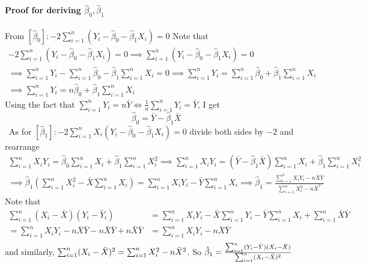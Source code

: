 \begin{mdframed}[backgroundcolor=blue!5] 
\textbf{Proof for deriving $\hat{\beta}_0,\hat{\beta}_1$}
\\ \\
\footnotesize{From $[\hat{\beta}_0]: -2\sum_{i=1}^n(Y_i-\hat{\beta}_0-\hat{\beta}_1X_i)=0$ Note that 
\begin{gather*}
-2\sum_{i=1}^n(Y_i-\hat{\beta}_0-\hat{\beta}_1X_i)=0 \implies \sum_{i=1}^n(Y_i-\hat{\beta}_0-\hat{\beta}_1X_i)=0 \\
\implies  \sum_{i=1}^n Y_i -\sum_{i=1}^n\hat{\beta}_0 -\hat{\beta}_1\sum_{i=1}^nX_i =0 \implies  \sum_{i=1}^n Y_i =\sum_{i=1}^n\hat{\beta}_0 +\hat{\beta}_1\sum_{i=1}^nX_i \\
\implies  \sum_{i=1}^n Y_i =n\hat{\beta}_0 +\hat{\beta}_1\sum_{i=1}^nX_i
\end{gather*}
Using the fact that $\sum_{i=1}^n Y_i = n\bar{Y} \iff \frac{1}{n}\sum_{i=1}^n Y_i = \bar{Y}$, I get
\[
\hat{\beta}_0=\bar{Y}-\hat{\beta}_1\bar{X}
\]\
As for $[\hat{\beta}_1]: -2\sum_{i=1}^nX_i(Y_i-\hat{\beta}_0-\hat{\beta}_1X_i)=0$ divide both sides by $-2$ and rearrange
\begin{gather*}
\sum_{i=1}^nX_iY_i=\hat{\beta}_0\sum_{i=1}^nX_i +\hat{\beta}_1\sum_{i=1}^nX_i^2\implies \sum_{i=1}^nX_iY_i=(\bar{Y}-\hat{\beta}_1\bar{X})\sum_{i=1}^nX_i +\hat{\beta}_1\sum_{i=1}^nX_i^2\\
\implies\hat{\beta}_1\left(\sum_{i=1}^nX_i^2-\bar{X}\sum_{i=1}^nX_i\right)=\sum_{i=1}^nX_iY_i-\bar{Y}\sum_{i=1}^nX_i
\implies \hat{\beta}_1 = \frac{\sum_{i=1}^nX_iY_i - n\bar{X}\bar{Y}}{\sum_{i=1}^nX_i^2-n{\bar{X}}^2}
\end{gather*}
Note that 
\[
\begin{aligned}
\sum_{i=1}^n(X_i-\bar{X})(Y_i-\bar{Y}_i) &= \sum_{i=1}^nX_iY_i - \bar{X}\sum_{i=1}^nY_i -\bar{Y}\sum_{i=1}^nX_i +\sum_{i=1}^n\bar{X}\bar{Y} \\
=\sum_{i=1}^nX_iY_i - n\bar{X}\bar{Y} -n\bar{X}\bar{Y} +n\bar{X}\bar{Y} &= \sum_{i=1}^nX_iY_i - n\bar{X}\bar{Y} \\
 \end{aligned}
\]}\normalsize
and similarly, $\footnotesize{\sum_{i=1}^n(X_i-\bar{X})^2 = \sum_{i=1}^nX_i^2-n{\bar{X}}^2}\normalsize$. So $\footnotesize{
\hat{\beta}_1=\frac{\sum_{i=1}^n(Y_i-\bar{Y})(X_i-\bar{X})}{\sum_{i=1}^n(X_i-\bar{X})^2}
}$\normalsize
\end{mdframed}
\par




